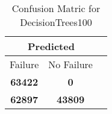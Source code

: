 \begin{table}[] 
\caption{Confusion Matric for DecisionTrees100} 
\label{Table: Prediction Accuracy-NoneDecisionTrees100RandomForest100EKF-ignoresolarPanelDipole-solarPanelDipole} 
\centering 
\begin{tabular} 
 {@{}ccc@{}} 
\toprule 
\multicolumn{2}{c}{\textbf{Predicted}}
 \\ \midrule 
\multicolumn{1}{|c|}{Failure} & 
\multicolumn{1}{c|}{No Failure}
 \\ \midrule 
\multicolumn{1}{|c|}{\color{green}\textbf{63422}} & 
\multicolumn{1}{c|}{\color{red}\textbf{0}}
 \\ \midrule 
\multicolumn{1}{|c|}{\color{red}\textbf{62897}} & 
\multicolumn{1}{c|}{\color{green}\textbf{43809}}
 \\ \bottomrule 
\end{tabular} 
\end{table} 
